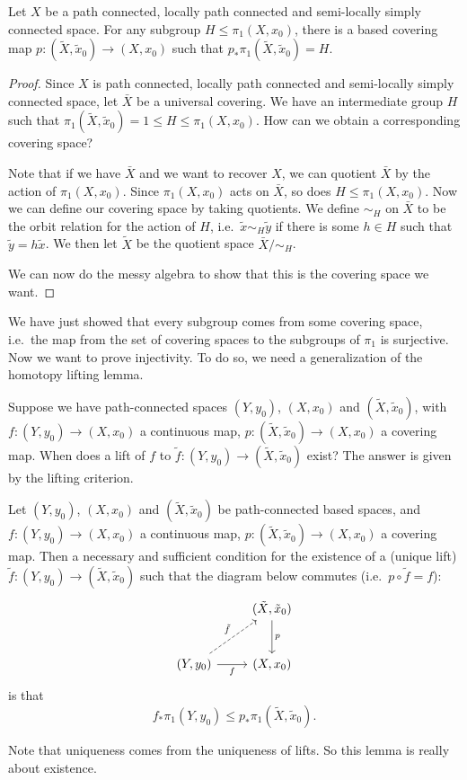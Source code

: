 \documentclass[a4paper]{article}
\begin{document}
\begin{prop}
  Let $X$ be a path connected, locally path connected and semi-locally simply connected space. For any subgroup $H \leq \pi_1(X, x_0)$, there is a based covering map $p: (\tilde{X}, \tilde{x}_0)\to (X, x_0)$ such that $p_* \pi_1(\tilde{X}, \tilde{x}_0) = H$.
\end{prop}

\begin{proof}
  Since $X$ is path connected, locally path connected and semi-locally simply connected space, let $\bar{X}$ be a universal covering. We have an intermediate group $H$ such that $\pi_1(\tilde{X}, \tilde{x}_0) = 1 \leq H \leq \pi_1(X, x_0)$. How can we obtain a corresponding covering space?

  Note that if we have $\bar{X}$ and we want to recover $X$, we can quotient $\bar{X}$ by the action of $\pi_1(X, x_0)$. Since $\pi_1(X, x_0)$ acts on $\bar{X}$, so does $H \leq \pi_1(X, x_0)$. Now we can define our covering space by taking quotients. We define $\sim_H$ on $\bar{X}$ to be the orbit relation for the action of $H$, i.e.\ $\tilde{x} \sim_H \tilde{y}$ if there is some $h \in H$ such that $\tilde{y} = h\tilde{x}$. We then let $\tilde{X}$ be the quotient space $\bar{X}/{\sim_H}$.

  We can now do the messy algebra to show that this is the covering space we want. %
\end{proof}
We have just showed that every subgroup comes from some covering space, i.e.\ the map from the set of covering spaces to the subgroups of $\pi_1$ is surjective. Now we want to prove injectivity. To do so, we need a generalization of the homotopy lifting lemma.

Suppose we have path-connected spaces $(Y, y_0)$, $(X, x_0)$ and $(\tilde{X}, \tilde{x}_0)$, with $f: (Y, y_0) \to (X, x_0)$ a continuous map, $p: (\tilde{X}, \tilde{x}_0) \to (X, x_0)$ a covering map. When does a lift of $f$ to $\tilde{f}: (Y, y_0) \to (\tilde{X}, \tilde{x}_0)$ exist? The answer is given by the lifting criterion.

\begin{lemma}
  Let $(Y, y_0)$, $(X, x_0)$ and $(\tilde{X}, \tilde{x}_0)$ be path-connected based spaces, and $f: (Y, y_0) \to (X, x_0)$ a continuous map, $p: (\tilde{X}, \tilde{x}_0) \to (X, x_0)$ a covering map. Then a necessary and sufficient condition for the existence of a (unique lift) $\tilde{f}: (Y, y_0) \to (\tilde{X}, \tilde{x}_0)$ such that the diagram below commutes (i.e.\ $p\circ \tilde{f} = f$):
  \[
    \begin{tikzcd}[row sep=large]
      & (\tilde{X}, \tilde{x}_0) \ar[d, "p"]\\
      (Y, y_0) \ar [r, "f"'] \ar [ru, dashed, "\tilde{f}"] & (X, x_0)
    \end{tikzcd}
  \]
  is that
  \[
    f_* \pi_1(Y, y_0) \leq p_*\pi_1(\tilde{X}, \tilde{x}_0).
  \]
\end{lemma}
Note that uniqueness comes from the uniqueness of lifts. So this lemma is really about existence.
\end{document}
